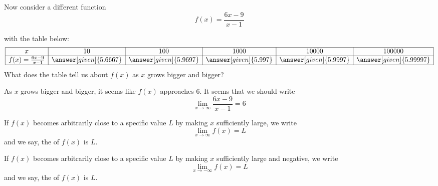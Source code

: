 \documentclass{ximera}
\begin{document}
\begin{example}
Now consider a different function
\[
f(x) = \frac{6x-9}{x-1}
\]
\begin{image}
\end{image}
with the table below:
  \[
\begin{array}{|c|c|c|c|c|c|}
\hline
x & 10 & 100& 1000&10000 & 100000 \\\hline

f(x)=\frac{6x-9}{x-1} & \answer[given]{5.6667} & \answer[given]{5.9697} & \answer[given]{5.997} & \answer[given]{5.9997} & \answer[given]{5.99997}  \\
\hline
\end{array}
  \]
What does the table tell us about $f(x)$ as $x$ grows bigger and bigger?
\begin{explanation}
As $x$ grows bigger and bigger, it seems like $f(x)$ approaches $6$.
It seems that we should write
\[
 \lim_{x\to \infty}\frac{6x-9}{x-1}=6 
\]
\end{explanation}
\end{example}

\begin{definition}\label{def:limitAtInfty}
If $f(x)$ becomes arbitrarily close to a specific value $L$ by making
$x$ sufficiently large, we write
\[
\lim_{x\to \infty} f(x) = L
\]
and we say, the  of $f(x)$ is $L$.  

If $f(x)$ becomes arbitrarily close to a specific value $L$ by making
$x$ sufficiently large and negative, we write
\[
\lim_{x\to -\infty} f(x) = L
\]
and we say, the  of $f(x)$ is $L$.  
\end{definition}
\end{document}
